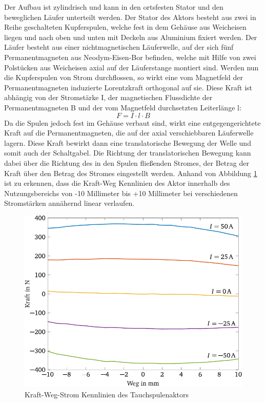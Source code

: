 Der Aufbau ist zylindrisch und kann in den ortsfesten Stator und den beweglichen Läufer unterteilt werden. Der Stator des Aktors besteht aus zwei in Reihe geschalteten Kupferspulen, welche fest in dem Gehäuse aus Weicheisen liegen und nach oben und unten mit Deckeln aus Aluminium fixiert werden. Der Läufer besteht aus einer nichtmagnetischen Läuferwelle, auf der sich fünf Permanentmagneten aus Neodym-Eisen-Bor befinden, welche mit Hilfe von zwei Polstücken aus Weicheisen axial auf der Läuferstange montiert sind. 
Werden nun die Kupferspulen von Strom durchflossen, so wirkt eine vom Magnetfeld der Permanentmagneten induzierte Lorentzkraft orthogonal auf sie. Diese Kraft ist abhängig von der Stromstärke I, der magnetischen Flussdichte der Permanentmagneten B und der vom Magnetfeld durchsetzten Leiterlänge l:
\begin{equation}
F=I\cdot l\cdot B
\end{equation}
Da die Spulen jedoch fest im Gehäuse verbaut sind, wirkt eine entgegengerichtete Kraft auf die Permanentmagneten, die auf der axial verschiebbaren Läuferwelle lagern. Diese Kraft bewirkt dann eine translatorische Bewegung der Welle und somit auch der Schaltgabel. Die Richtung der translatorischen Bewegung kann dabei über die Richtung des in den Spulen fließenden Stromes, der Betrag der Kraft über den Betrag des Stromes eingestellt werden.
Anhand von Abbildung \ref{fig:Kennlinie Aktor} ist zu erkennen, dass die Kraft-Weg Kennlinien des Aktor innerhalb des Nutzungsbereichs von -10 Millimeter bis +10 Millimeter bei verschiedenen Stromstärken annähernd linear verlaufen. 

\begin{figure}[h]
	\centering
		\includegraphics{Bilder/KennlinieAktor.pdf}
	\caption{Kraft-Weg-Strom Kennlinien des Tauchspulenaktors \cite[S.12]{adp}}
	\label{fig:Kennlinie Aktor}
\end{figure}

